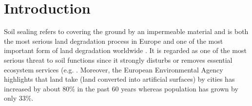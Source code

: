 \documentclass[APA,LATO1COL,doublespace]{WileyNJD-v2}
\newcommand{\toberevised}[1]{\emph{\textcolor{red}{#1}}} %
\begin{document}
\maketitle


\section{Introduction}\label{sec1}
Soil sealing refers to covering the ground by an impermeable material and is both the most serious land degradation process in Europe and one of the most important form of land degradation worldwide \citep{FAO15}.
It is regarded as one of the most serious threat to soil functions since it strongly disturbs or removes essential ecosystem services (e.g. \citealp{Calzolari16,Dunbar13}.
Moreover, the European Environmental Agency \citep{EEA2011} highlights that land take (land converted into artificial surfaces) by cities has increased by about 80\% in the past 60 years whereas population has grown by only 33\%.
\end{document}
